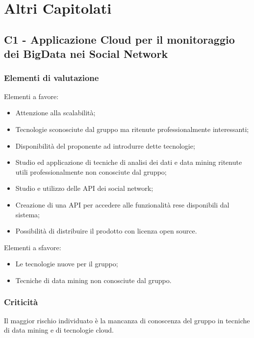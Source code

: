 \section{Altri Capitolati}
\subsection{C1 - Applicazione Cloud per il monitoraggio dei BigData nei Social Network}{
	\subsubsection{Elementi di valutazione}{
		Elementi a favore:
		\begin{itemize}
			\item Attenzione alla scalabilità;
			\item Tecnologie sconosciute dal gruppo ma ritenute professionalmente interessanti;
			\item Disponibilità del proponente ad introdurre dette tecnologie;
			\item Studio ed applicazione di tecniche di analisi dei dati e data mining ritenute utili professionalmente non conosciute dal gruppo;
			\item Studio e utilizzo delle API dei social network;
			\item Creazione di una API per accedere alle funzionalità rese disponibili dal sistema;
			\item Possibilità di distribuire il prodotto con licenza open source.
		\end{itemize}
		
		Elementi a sfavore:
		\begin{itemize}
			\item Le tecnologie nuove per il gruppo;
			\item Tecniche di data mining non conosciute dal gruppo.
		\end{itemize}
	}
	\subsubsection{Criticità}{
		Il maggior rischio individuato è la mancanza di conoscenza del gruppo in tecniche di data mining e di tecnologie cloud.
	}
}

